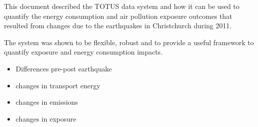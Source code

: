This document described the TOTUS data system and how it can be used to quantify the energy consumption and air pollution exposure outcomes that resulted from changes due to the earthquakes in Christchurch during 2011.

The system was shown to be flexible, robust and to provide a useful framework to quantify exposure and energy consumption impacts.

\begin{itemize}
	\item Differences pre-post earthquake
	\item changes in transport energy
	\item changes in emissions
	\item changes in exposure
\end{itemize}